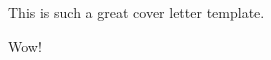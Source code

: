 \documentclass{article}
\begin{document}
This is such a great cover letter template.

Wow!
\end{document}
